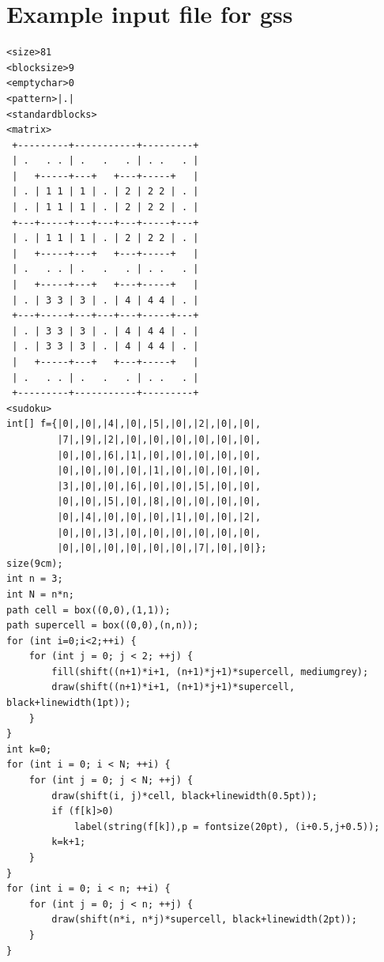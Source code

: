 \documentclass[12pt]{article}
\begin{document}
\appendix
\section{\label{NRC4ASY}Example input file for gss}
\begin{verbatim}
<size>81
<blocksize>9
<emptychar>0
<pattern>|.|
<standardblocks>
<matrix>
 +---------+-----------+---------+ 
 | .   . . | .   .   . | . .   . |
 |   +-----+---+   +---+-----+   |       
 | . | 1 1 | 1 | . | 2 | 2 2 | . |
 | . | 1 1 | 1 | . | 2 | 2 2 | . |
 +---+-----+---+---+---+-----+---+ 
 | . | 1 1 | 1 | . | 2 | 2 2 | . |
 |   +-----+---+   +---+-----+   |   
 | .   . . | .   .   . | . .   . |
 |   +-----+---+   +---+-----+   |       
 | . | 3 3 | 3 | . | 4 | 4 4 | . |
 +---+-----+---+---+---+-----+---+ 
 | . | 3 3 | 3 | . | 4 | 4 4 | . |
 | . | 3 3 | 3 | . | 4 | 4 4 | . |
 |   +-----+---+   +---+-----+   |  
 | .   . . | .   .   . | . .   . |
 +---------+-----------+---------+
<sudoku>
int[] f={|0|,|0|,|4|,|0|,|5|,|0|,|2|,|0|,|0|,
         |7|,|9|,|2|,|0|,|0|,|0|,|0|,|0|,|0|,
         |0|,|0|,|6|,|1|,|0|,|0|,|0|,|0|,|0|,
         |0|,|0|,|0|,|0|,|1|,|0|,|0|,|0|,|0|,
         |3|,|0|,|0|,|6|,|0|,|0|,|5|,|0|,|0|,
         |0|,|0|,|5|,|0|,|8|,|0|,|0|,|0|,|0|,
         |0|,|4|,|0|,|0|,|0|,|1|,|0|,|0|,|2|,
         |0|,|0|,|3|,|0|,|0|,|0|,|0|,|0|,|0|,
         |0|,|0|,|0|,|0|,|0|,|0|,|7|,|0|,|0|};
size(9cm);
int n = 3;
int N = n*n;
path cell = box((0,0),(1,1));
path supercell = box((0,0),(n,n));
for (int i=0;i<2;++i) {
    for (int j = 0; j < 2; ++j) {
        fill(shift((n+1)*i+1, (n+1)*j+1)*supercell, mediumgrey);
        draw(shift((n+1)*i+1, (n+1)*j+1)*supercell, black+linewidth(1pt));
    }
}
int k=0;
for (int i = 0; i < N; ++i) {
    for (int j = 0; j < N; ++j) {
        draw(shift(i, j)*cell, black+linewidth(0.5pt));
        if (f[k]>0)
            label(string(f[k]),p = fontsize(20pt), (i+0.5,j+0.5));
        k=k+1;
    }
}
for (int i = 0; i < n; ++i) {
    for (int j = 0; j < n; ++j) {
        draw(shift(n*i, n*j)*supercell, black+linewidth(2pt));
    }
}
\end{verbatim}
\end{document}
